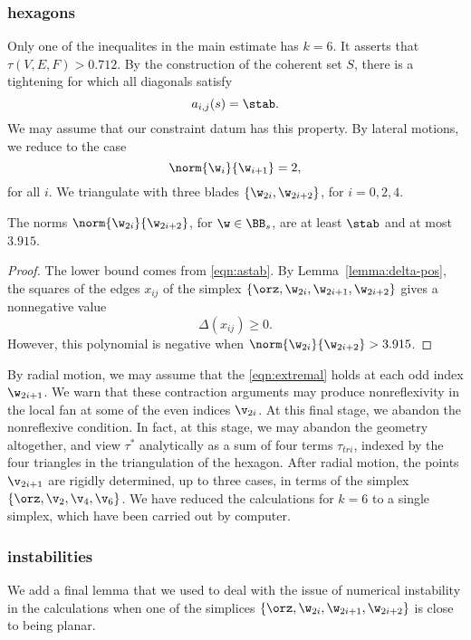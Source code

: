 \subsubsection{hexagons}

Only one of the inequalites in the main estimate has $k=6$.  It
asserts that $\tau(V,E,F) > 0.712$.  By the construction of the
coherent set $S$, there is a tightening for which all diagonals
satisfy
\begin{equation}\label{eqn:astab}
a_{i,j}(s)=\stab.
\end{equation}  
We may assume that our constraint datum
has this property.
By lateral motions, we reduce to the case
\[
\norm{\w_i}{\w_{i+1}}=2,
\]
for all $i$.  We triangulate with three blades
$\{\w_{2i},\w_{2i+2}\}$, for $i=0,2,4$.

\begin{lemma}
The norms $\norm{\w_{2i}}{\w_{2i+2}}$, for $\w\in \BB_s$, 
are at least $\stab$ and at most $3.915$.
\end{lemma}

\begin{proof}
  The lower bound comes from \eqref{eqn:astab}.  By
  Lemma~\ref{lemma:delta-pos}, the squares of the edges $x_{ij}$ of
  the simplex $\{\orz,\w_{2i},\w_{2i+1},\w_{2i+2}\}$ gives a
  nonnegative value
\[
\Delta(x_{ij})\ge 0.
\]
However, this polynomial is  negative when
$\norm{\w_{2i}}{\w_{2i+2}} > 3.915$.
\end{proof}

By radial motion, we may assume that the \eqref{eqn:extremal} holds at
each odd index $\w_{2i+1}$.  We warn that these contraction arguments
may produce nonreflexivity in the local fan at some of the even
indices $\v_{2i}$.  At this final stage, we abandon the nonreflexive
condition.  In fact, at this stage, we may abandon the geometry
altogether, and view $\tau^*$ analytically as a sum of four terms
$\tau_{tri}$, indexed by the four triangles in the triangulation of
the hexagon.  After radial motion, the points $\v_{2i+1}$ are rigidly
determined, up to three cases, in terms of the simplex
$\{\orz,\v_2,\v_4,\v_6\}$.  We have reduced the calculations for $k=6$
to a single simplex, which have been carried out by computer.

\subsubsection{instabilities}

We add a final lemma that we used to deal with the issue of numerical
instability in the calculations when one of the simplices 
$\{\orz,\w_{2i},\w_{2i+1},\w_{2i+2}\}$ is close to being planar.

